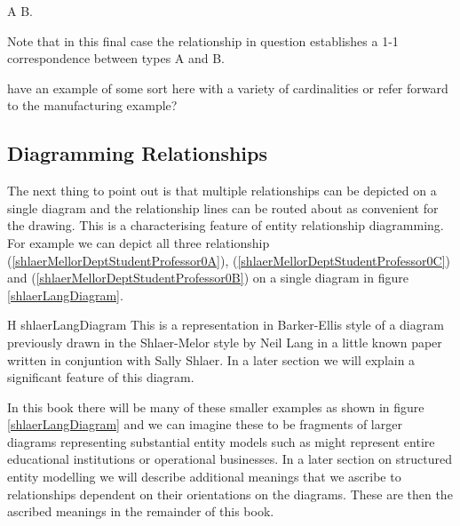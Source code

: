 A\,\barkerEllisH\,B.

Note that in this final case the relationship in question establishes a 1-1 correspondence between types A and B.

\begin{noteforfuture}
have an example of some sort here with a variety of cardinalities or refer forward to the manufacturing example?
\end{noteforfuture}

\subsection{Diagramming Relationships}
The next thing to point out is that multiple relationships can be depicted on a single diagram and the relationship lines can be routed about as convenient for the drawing. This is a characterising feature of entity relationship diagramming.
For example we can depict all three relationship 
(\ref{shlaerMellorDeptStudentProfessor0A}), 
(\ref{shlaerMellorDeptStudentProfessor0C}) and 
(\ref{shlaerMellorDeptStudentProfessor0B}) on a single diagram in figure \ref{shlaerLangDiagram}.
\begin{erboxedFigure}{H}
{shlaerLangDiagram}
{This is a representation in Barker-Ellis style of a diagram  previously drawn 
in the Shlaer-Melor style by Neil Lang 
 in a  little known paper written  in conjuntion with Sally Shlaer. In a later section we will explain 
 a significant feature of this diagram.}

\end{erboxedFigure}

 In this book there will be many of these smaller examples as shown in figure \ref{shlaerLangDiagram} and we can imagine  these to be fragments of larger diagrams  representing substantial entity models such as 
 might represent entire educational institutions or operational businesses. 
In a later section on structured entity modelling we will describe additional meanings that we ascribe to relationships dependent on their orientations on the diagrams. These are then the ascribed meanings in the remainder of this book. 

